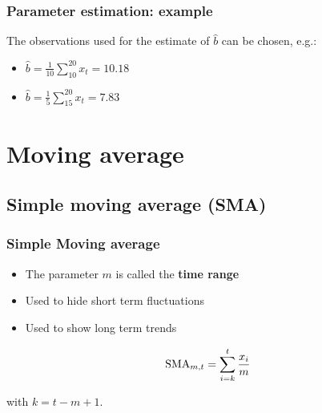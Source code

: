 \documentclass{beamer}
\begin{document}
\begin{frame}%
  \frametitle{Parameter estimation: example}

  The observations used for the estimate of $\widehat{b}$ can be chosen, e.g.:

  \begin{itemize}
    \item $\widehat{b} = \frac{1}{10} \sum_{10}^{20} x_{t} = 10.18$
    \item $\widehat{b} = \frac{1}{5} \sum_{15}^{20} x_{t} = 7.83$
  \end{itemize}

\end{frame}

\section{Moving average}

\subsection{Simple moving average (SMA)}

\begin{frame}
  \frametitle{Simple Moving average}


  \begin{itemize}
    \item The parameter $m$ is called the \textbf{time range}
    \item Used to hide short term fluctuations
    \item Used to show long term trends
  \end{itemize}

  \begin{equation}
    \textnormal{SMA}_{m,t} = \sum_{i=k}^{t} \frac{x_{i}}{m}
    \label{eq:movingAverage}
  \end{equation}

  with $k = t - m + 1$.
\end{frame}
\end{document}
